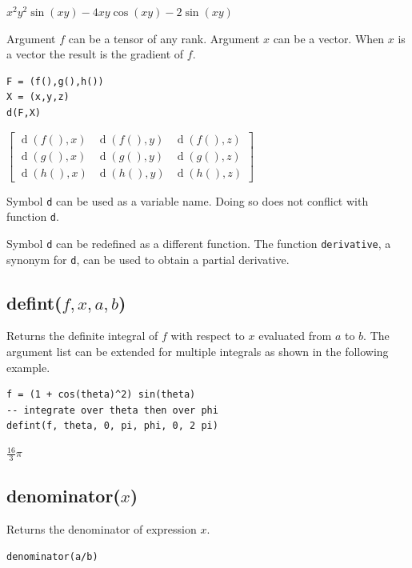 \documentclass[12pt]{article}
\begin{document}
\noindent
$x^2y^2\sin(xy)-4xy\cos(xy)-2\sin(xy)$

\bigskip
\noindent
Argument $f$ can be a tensor of any rank.
Argument $x$ can be a vector.
When $x$ is a vector the result is the gradient of $f$.

{\color{blue}
\begin{verbatim}
F = (f(),g(),h())
X = (x,y,z)
d(F,X)
\end{verbatim}
}

\noindent
$\displaystyle
\begin{bmatrix}
\operatorname{d}(f(),x) & \operatorname{d}(f(),y) &  \operatorname{d}(f(),z)
\\[1ex]
\operatorname{d}(g(),x) & \operatorname{d}(g(),y) &  \operatorname{d}(g(),z)
\\[1ex]
\operatorname{d}(h(),x) & \operatorname{d}(h(),y) &  \operatorname{d}(h(),z)
\end{bmatrix}
$

\bigskip
\noindent
Symbol \verb$d$ can be used as a variable name.
Doing so does not conflict with function \verb$d$.

\bigskip
\noindent
Symbol \verb$d$ can be redefined as a different function.
The function \verb$derivative$, a synonym for \verb$d$, can be used to obtain a partial derivative.

\subsection*{defint($f,x,a,b$)}

Returns the definite integral of $f$ with respect to $x$
evaluated from $a$ to $b$.
The argument list can be extended for multiple integrals
as shown in the following example.

{\color{blue}
\begin{verbatim}
f = (1 + cos(theta)^2) sin(theta)
-- integrate over theta then over phi
defint(f, theta, 0, pi, phi, 0, 2 pi)
\end{verbatim}
}

\noindent
$\tfrac{16}{3}\pi$

\subsection*{denominator($x$)}

Returns the denominator of expression $x$.

{\color{blue}
\begin{verbatim}
denominator(a/b)
\end{verbatim}
}
\end{document}
